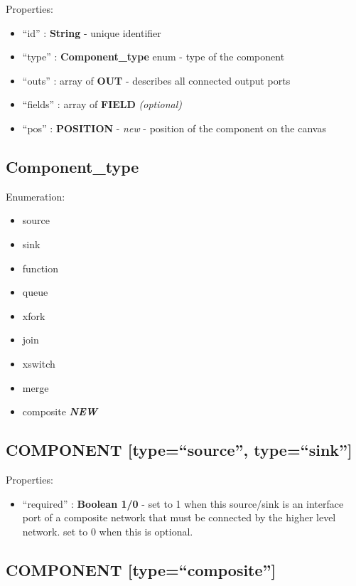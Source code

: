 Properties:

\begin{itemize}
\itemsep1pt\parskip0pt
\item
  ``id'' : \textbf{String} - unique identifier
\item
  ``type'' : \textbf{Component\_type} enum - type of the component
\item
  ``outs'' : array of \textbf{OUT} - describes all connected output
  ports
\item
  ``fields'' : array of \textbf{FIELD} \emph{(optional)}
\item
  ``pos'' : \textbf{POSITION} - \emph{new} - position of the component
  on the canvas
\end{itemize}

\subsection{Component\_type}\label{componentux5ftype}

Enumeration:

\begin{itemize}
\itemsep1pt\parskip0pt
\item
  source
\item
  sink
\item
  function
\item
  queue
\item
  xfork
\item
  join
\item
  xswitch
\item
  merge
\item
  composite \textbf{\emph{NEW}}
\end{itemize}

\subsection{COMPONENT {[}type=``source'',
type=``sink''{]}}\label{component-typesource-typesink}

Properties:

\begin{itemize}
\itemsep1pt\parskip0pt
\item
  ``required'' : \textbf{Boolean 1/0} - set to 1 when this source/sink
  is an interface port of a composite network that must be connected by
  the higher level network. set to 0 when this is optional.
\end{itemize}

\subsection{COMPONENT
{[}type=``composite''{]}}\label{component-typecomposite}

